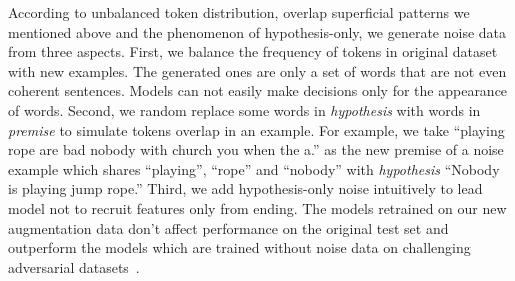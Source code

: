 According to unbalanced token distribution, overlap superficial patterns we 
mentioned above and the phenomenon of hypothesis-only,
we generate noise data from three aspects. 
First, we balance the frequency of tokens in original dataset with new examples.
The generated ones are only a set of words that are not even coherent sentences. 
Models can not easily make decisions only for the appearance of words. 
Second, we random replace some words in \textit{hypothesis}
with words in \textit{premise}
to simulate tokens overlap in an example. 
For example, we take ``playing rope are bad nobody with church 
you when the a.'' as the new premise of a noise example which shares ``playing'', ``rope'' and ``nobody'' 
with \textit{hypothesis} ``Nobody is playing jump rope.''
Third, we add hypothesis-only noise intuitively to lead model not to recruit
features only from ending.
The models retrained on our new augmentation data 
don't affect performance on the original test set 
and outperform the models which are trained without noise data
on challenging adversarial datasets~. 






